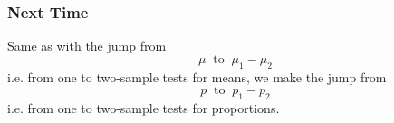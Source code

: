 \documentclass[slides]{beamer}
\begin{document}
\begin{frame}[fragile]
\frametitle{Next Time}

Same as with the jump from 
\[\mu \ \mbox{ to } \ \mu_1-\mu_2\] 
i.e. from one to two-sample tests for means, 
we make the jump from 
\[p \ \mbox{ to } \ p_1-p_2\]
i.e. from one to two-sample tests for proportions.
\end{frame}
\end{document}
